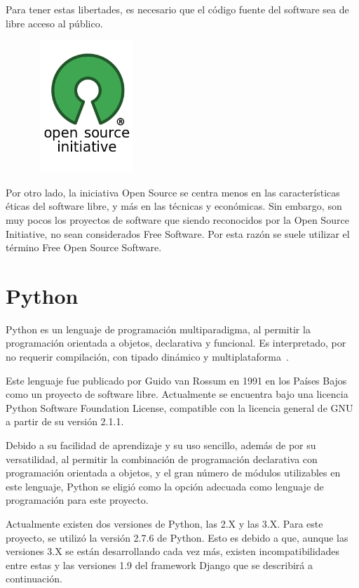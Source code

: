 \documentclass[a4paper, spanish, 12pt]{book}
\begin{document}
Para tener estas libertades, es necesario que el c\'odigo fuente del software sea
de libre acceso al p\'ublico.

\begin{figure}[H]
  \centering
  \includegraphics[height=5cm, width=4cm, keepaspectratio]{img/Opensource}
\end{figure}

Por otro lado, la iniciativa Open Source se centra menos en las caracter\'isticas
\'eticas del software libre, y m\'as en las t\'ecnicas y econ\'omicas. Sin embargo,
son muy pocos los proyectos de software que siendo reconocidos por la Open
Source Initiative, no sean considerados Free Software. Por esta raz\'on se suele
utilizar el t\'ermino Free Open Source Software.

\section{Python}
\label{sec:python}

Python es un lenguaje de programaci\'on multiparadigma, al permitir la programaci\'on
orientada a objetos, declarativa y funcional. Es interpretado, por no requerir
compilaci\'on, con tipado din\'amico y multiplataforma~\cite{python}.

Este lenguaje fue publicado por Guido van Rossum en 1991 en los Pa\'ises Bajos
como un proyecto de software libre. Actualmente se encuentra bajo una licencia
Python Software Foundation License, compatible con la licencia general de GNU a partir
de su versi\'on 2.1.1.

Debido a su facilidad de aprendizaje y su uso sencillo, adem\'as de por su versatilidad,
al permitir la combinaci\'on de programaci\'on declarativa con programaci\'on orientada
a objetos, y el gran n\'umero de m\'odulos utilizables en este lenguaje, Python se eligi\'o
como la opci\'on adecuada como lenguaje de programaci\'on para este proyecto.

Actualmente existen dos versiones de Python, las 2.X y las 3.X. Para este proyecto,
se utiliz\'o la versi\'on 2.7.6 de Python. Esto es debido a que, aunque las versiones
3.X se est\'an desarrollando cada vez m\'as, existen incompatibilidades entre estas
y las versiones 1.9 del framework Django que se describir\'a a continuaci\'on.
\end{document}

